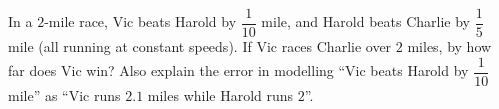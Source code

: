 In a $2$-mile race, Vic beats Harold by $\dfrac1{10}$ mile, and Harold beats Charlie by $\dfrac15$ mile (all running at constant speeds). If Vic races Charlie over $2$ miles, by how far does Vic win? Also explain the error in modelling ``Vic beats Harold by $\dfrac1{10}$ mile'' as ``Vic runs $2.1$ miles while Harold runs $2$''.
